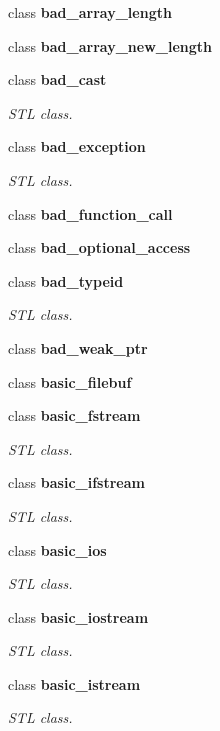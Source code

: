 \begin{DoxyCompactItemize}
class \textbf{ bad\+\_\+array\+\_\+length}
\item 
class \textbf{ bad\+\_\+array\+\_\+new\+\_\+length}
\item 
class \textbf{ bad\+\_\+cast}
\begin{DoxyCompactList}\small\item\em S\+TL class. \end{DoxyCompactList}\item 
class \textbf{ bad\+\_\+exception}
\begin{DoxyCompactList}\small\item\em S\+TL class. \end{DoxyCompactList}\item 
class \textbf{ bad\+\_\+function\+\_\+call}
\item 
class \textbf{ bad\+\_\+optional\+\_\+access}
\item 
class \textbf{ bad\+\_\+typeid}
\begin{DoxyCompactList}\small\item\em S\+TL class. \end{DoxyCompactList}\item 
class \textbf{ bad\+\_\+weak\+\_\+ptr}
\item 
class \textbf{ basic\+\_\+filebuf}
\item 
class \textbf{ basic\+\_\+fstream}
\begin{DoxyCompactList}\small\item\em S\+TL class. \end{DoxyCompactList}\item 
class \textbf{ basic\+\_\+ifstream}
\begin{DoxyCompactList}\small\item\em S\+TL class. \end{DoxyCompactList}\item 
class \textbf{ basic\+\_\+ios}
\begin{DoxyCompactList}\small\item\em S\+TL class. \end{DoxyCompactList}\item 
class \textbf{ basic\+\_\+iostream}
\begin{DoxyCompactList}\small\item\em S\+TL class. \end{DoxyCompactList}\item 
class \textbf{ basic\+\_\+istream}
\begin{DoxyCompactList}\small\item\em S\+TL class. \end{DoxyCompactList}\item 

\end{DoxyCompactItemize}
